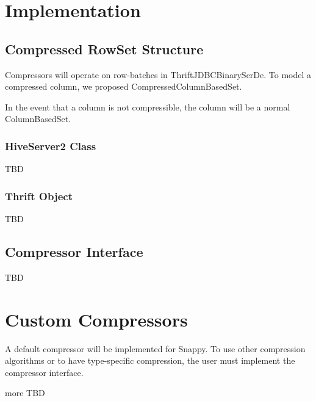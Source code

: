 \documentclass[11pt,a4paper]{article}
\begin{document}
\section{Implementation}
	\subsection{Compressed RowSet Structure}
		Compressors will operate on row-batches in ThriftJDBCBinarySerDe. 
		To model a compressed column, we proposed CompressedColumnBasedSet.
		
		In the event that a column is not compressible, the column will be a normal ColumnBasedSet.
		
		\subsubsection{HiveServer2 Class}
			TBD
			
		\subsubsection{Thrift Object}
			TBD
			
	\subsection{Compressor Interface}
		TBD

\section{Custom Compressors}
		A default compressor will be implemented for Snappy.
		To use other compression algorithms or to have type-specific compression, the user must implement the compressor interface.

		more TBD
		
\end{document}
